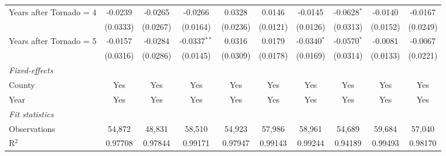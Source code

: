 \documentclass[letterpaper]{article}
\begin{document}
\begin{table}[H]
{\begin{tabular}{lccccccccc}
   Years after Tornado = 4      & -0.0239                        & -0.0265                       & -0.0266                         & 0.0328                          & 0.0146                    & -0.0145                       & -0.0628$^{*}$            & -0.0140                 & -0.0167\\   
                                             & (0.0333)                       & (0.0267)                      & (0.0164)                        & (0.0236)                        & (0.0121)                  & (0.0126)                      & (0.0313)                 & (0.0152)                & (0.0249)\\   
   Years after Tornado = 5      & -0.0157                        & -0.0284                       & -0.0337$^{**}$                  & 0.0316                          & 0.0179                    & -0.0340$^{*}$                 & -0.0570$^{*}$            & -0.0081                 & -0.0067\\   
                                             & (0.0316)                       & (0.0286)                      & (0.0145)                        & (0.0309)                        & (0.0178)                  & (0.0169)                      & (0.0314)                 & (0.0133)                & (0.0221)\\   

   \midrule
   \emph{Fixed-effects}\\
   County                                    & Yes                            & Yes                           & Yes                             & Yes                             & Yes                       & Yes                           & Yes                      & Yes                     & Yes\\  
   Year                                      & Yes                            & Yes                           & Yes                             & Yes                             & Yes                       & Yes                           & Yes                      & Yes                     & Yes\\  
   \midrule
   \emph{Fit statistics}\\
   Observations                              & 54,872                         & 48,831                        & 58,510                          & 54,923                          & 57,986                    & 58,961                        & 54,689                   & 59,684                  & 57,040\\  
   R$^2$                                     & 0.97708                        & 0.97844                       & 0.99171                         & 0.97947                         & 0.99143                   & 0.99244                       & 0.94189                  & 0.99493                 & 0.98170\\  


\end{tabular}}
\end{table}
\end{document}
